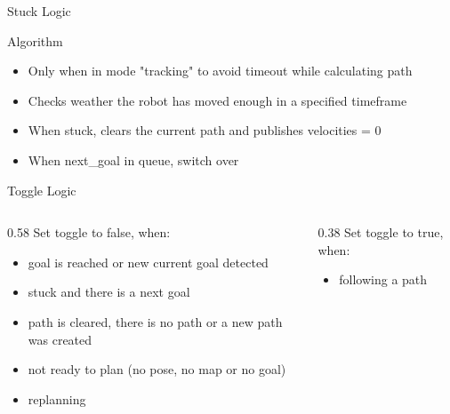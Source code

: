 \documentclass[aspectratio=169, 11pt]{beamer}
\begin{document}
\begin{frame}{Stuck Logic}
  \vspace{-0.2cm}
  \begin{block}{Algorithm}
    \small
    \begin{itemize}
      \setlength\itemsep{-0.2em}
      \item Only when in mode "tracking" to avoid timeout while calculating path
      \item Checks weather the robot has moved enough in a specified timeframe
      \item When stuck, clears the current path and publishes velocities = 0
      \item When next\_goal in queue, switch over
    \end{itemize}
  \end{block}
  \vspace{-0.3cm}
  \begin{block}{Toggle Logic}
    \small
    \vspace{-0.3cm}
    \begin{columns}[T]
      \begin{column}{0.58\textwidth}
        \vspace{0.1cm}
        \hspace{2cm}
        Set toggle to false, when:
        \vspace{-0.2cm}
        \begin{itemize}
          \setlength\itemsep{-0.3em}
          \item goal is reached or new current goal detected
          \item stuck and there is a next goal
          \item path is cleared, there is no path or a new path was created
          \item not ready to plan (no pose, no map or no goal)
          \item replanning
        \end{itemize}
      \end{column}
      \begin{column}{0.38\textwidth}
        \vspace{0.1cm}
        Set toggle to true, when:
        \vspace{-0.2cm}
        \begin{itemize}
          \item following a path
        \end{itemize}
      \end{column}
    \end{columns}
  \end{block}
\end{frame}
\end{document}
